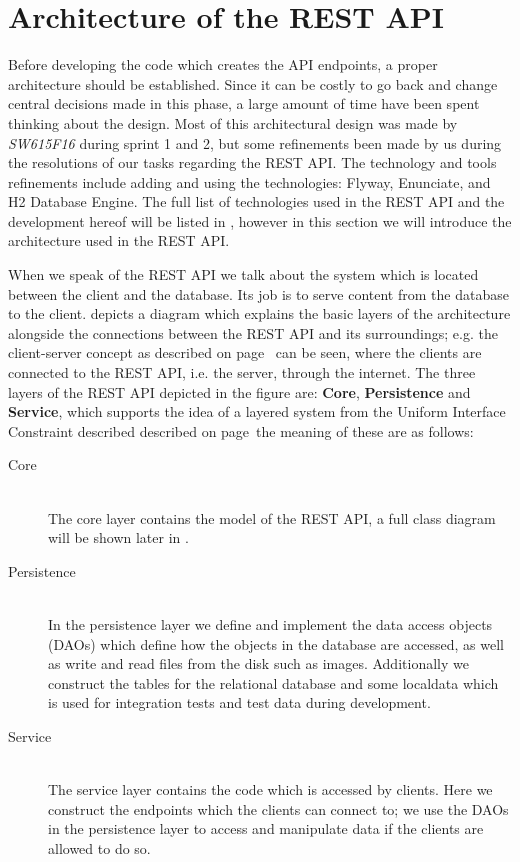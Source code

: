 \section{Architecture of the REST API}\label{sec:architecture}
Before developing the code which creates the API endpoints, a proper architecture should be established.
Since it can be costly to go back and change central decisions made in this phase, a large amount of time have been spent thinking about the design.
Most of this architectural design was made by \textit{SW615F16} during sprint 1 and 2, but some refinements been made by us during the resolutions of our tasks regarding the REST API.
The technology and tools refinements include adding and using the technologies: Flyway, Enunciate, and H2 Database Engine.
The full list of technologies used in the REST API and the development hereof will be listed in , however in this section we will introduce the architecture used in the REST API.

When we speak of the REST API we talk about the system which is located between the client and the database.
Its job is to serve content from the database to the client.
 depicts a diagram which explains the basic layers of the architecture alongside the connections between the REST API and its surroundings; e.g. the client-server concept as described on page~\pageref{client-server-rest} can be seen, where the clients are connected to the REST API, i.e. the server, through the internet.
The three layers of the REST API depicted in the figure are: \textbf{Core}, \textbf{Persistence} and \textbf{Service}, which supports the idea of a layered system from the Uniform Interface Constraint described described on page~\pageref{layeredsystem}the meaning of these are as follows:
\begin{description}
    \item[Core] \hfill \\
    The core layer contains the model of the REST API, a full class diagram will be shown later in .

    \item[Persistence] \hfill \\
    In the persistence layer we define and implement the data access objects (DAOs) which define how the objects in the database are accessed, as well as write and read files from the disk such as images.
    Additionally we construct the tables for the relational database and some localdata which is used for integration tests and test data during development.

    \item[Service] \hfill \\
    The service layer contains the code which is accessed by clients.
    Here we construct the endpoints which the clients can connect to; we use the DAOs in the persistence layer to access and manipulate data if the clients are allowed to do so.
\end{description}


